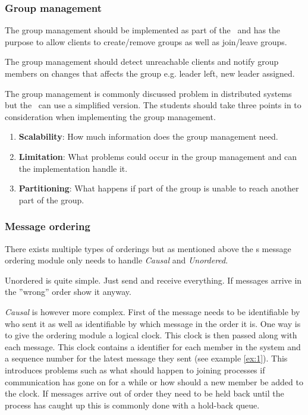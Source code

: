 \subsubsection{Group management}\label{sec:group}
The group management should be implemented as part of the \mw\ and has the purpose to allow clients to create/remove groups as well as join/leave groups.

The group management should detect unreachable clients and notify group members on changes that affects the group e.g. leader left, new leader assigned.

The group management is commonly discussed problem in distributed systems but the \mw\ can use a simplified version. The students should take three points in to consideration when implementing the group management.

\begin{enumerate}
	\item \textbf{Scalability}: How much information does the group management need.
	\item \textbf{Limitation}: What problems could occur in the group management and can the implementation handle it.
	\item \textbf{Partitioning}: What happens if part of the group is unable to reach another part of the group.
\end{enumerate}


\subsubsection{Message ordering}\label{sec:messageOrdering}
There exists multiple types of orderings but as mentioned above the \mw s message ordering module only needs to handle \textit{Causal} and \textit{Unordered}. 

Unordered is quite simple. Just send and receive everything. If messages arrive in the ''wrong'' order show it anyway.

\textit{Causal} is however more complex. First of the message needs to be identifiable by who sent it as well as identifiable by which message in the order it is. 
One way is to give the ordering module a logical clock. This clock is then passed along with each message. This clock contains a identifier for each member in the system and a sequence number for the latest message they sent (see example \ref{ex:1}). This introduces problems such as what should happen to joining processes if communication has gone on for a while or how should a new member be added to the clock. If messages arrive out of order they need to be held back until the process has caught up this is commonly done with a hold-back queue.

